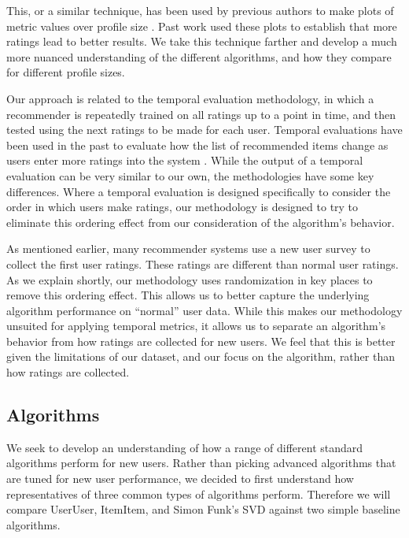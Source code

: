 \documentclass[letterpaper]{sig-alternate}
\begin{document}
  This, or a similar technique, has been used by previous authors to make plots of metric values over profile size \cite{DrennerInitialExperiance, TenIsEnough, AdaptiveBootstrap, LathiaTemporal}.
  Past work used these plots to establish that more ratings lead to better results.
  We take this technique farther and develop a much more nuanced understanding of the different algorithms, and how they compare for different profile sizes.

  Our approach is related to the temporal evaluation methodology, in which a recommender is repeatedly trained on all ratings up to a point in time, and then tested using the next ratings to be made for each user.
  Temporal evaluations have been used in the past to evaluate how the list of recommended items change as users enter more ratings into the system \cite{LathiaTemporal}.
  While the output of a temporal evaluation can be very similar to our own, the methodologies have some key differences.
  Where a temporal evaluation is designed specifically to consider the order in which users make ratings, our methodology is designed to try to eliminate this ordering effect from our consideration of the algorithm's behavior.

  As mentioned earlier, many recommender systems use a new user survey to collect the first user ratings.
  These ratings are different than normal user ratings.
  As we explain shortly, our methodology uses randomization in key places to remove this ordering effect.
  This allows us to better capture the underlying algorithm performance on ``normal'' user data.
  While this makes our methodology unsuited for applying temporal metrics, it allows us to separate an algorithm's behavior from how ratings are collected for new users.
  We feel that this is better given the limitations of our dataset, and our focus on the algorithm, rather than how ratings are collected.

  \subsection*{Algorithms}

  We seek to develop an understanding of how a range of different standard algorithms perform for new users.
  Rather than picking advanced algorithms that are tuned for new user performance, we decided to first understand how representatives of three common types of algorithms perform.
  Therefore we will compare UserUser\cite{resnick1994grouplens}, ItemItem\cite{sarwar2001item}, and Simon Funk's SVD\cite{funk_netflix_2006} against two simple baseline algorithms.
  
\end{document}
